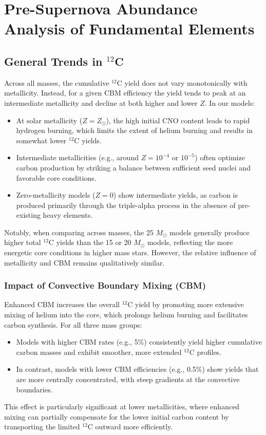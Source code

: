 \section{Pre-Supernova Abundance Analysis of Fundamental Elements}

\subsection{General Trends in \(^{12}\)C }
Across all masses, the cumulative $^{12}$C yield does not vary monotonically with metallicity. Instead, for a given CBM efficiency the yield tends to peak at an intermediate metallicity and decline at both higher and lower $Z$. In our models:
\begin{itemize}
    \item At solar metallicity ($Z = Z_\odot$), the high initial CNO content leads to rapid hydrogen burning, which limits the extent of helium burning and results in somewhat lower $^{12}$C yields.
    \item Intermediate metallicities (e.g., around $Z = 10^{-4}$ or $10^{-5}$) often optimize carbon production by striking a balance between sufficient seed nuclei and favorable core conditions.
    \item Zero-metallicity models ($Z = 0$) show intermediate yields, as carbon is produced primarily through the triple-alpha process in the absence of pre-existing heavy elements.
\end{itemize}
Notably, when comparing across masses, the 25 $M_\odot$ models generally produce higher total $^{12}$C yields than the 15 or 20 $M_\odot$ models, reflecting the more energetic core conditions in higher mass stars. However, the relative influence of metallicity and CBM remains qualitatively similar.

\subsubsection{Impact of Convective Boundary Mixing (CBM)}
Enhanced CBM increases the overall $^{12}$C yield by promoting more extensive mixing of helium into the core, which prolongs helium burning and facilitates carbon synthesis. For all three mass groups:
\begin{itemize}
    \item Models with higher CBM rates (e.g., 5\%) consistently yield higher cumulative carbon masses and exhibit smoother, more extended $^{12}$C profiles.
    \item In contrast, models with lower CBM efficiencies (e.g., 0.5\%) show yields that are more centrally concentrated, with steep gradients at the convective boundaries.
\end{itemize}
This effect is particularly significant at lower metallicities, where enhanced mixing can partially compensate for the lower initial carbon content by transporting the limited $^{12}$C outward more efficiently.

